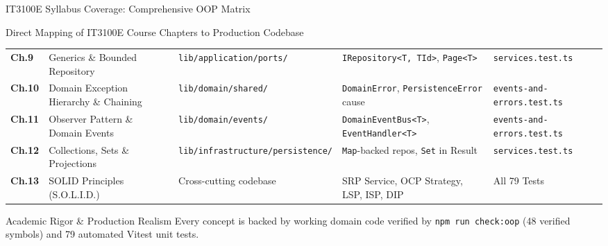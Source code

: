 ﻿\documentclass[aspectratio=169,10pt,t]{beamer}
\begin{document}
\begin{frame}{IT3100E Syllabus Coverage: Comprehensive OOP Matrix}
\begin{infoCard}{Direct Mapping of IT3100E Course Chapters to Production Codebase}
\begin{tabular}{@{}p{10mm}p{34mm}p{28mm}p{34mm}p{23mm}@{}}
      \textbf{Ch.9} & Generics \& Bounded Repository & \texttt{lib/application/ports/} & \texttt{IRepository<T, TId>}, \texttt{Page<T>} & \texttt{services.test.ts} \\
      \textbf{Ch.10} & Domain Exception Hierarchy \& Chaining & \texttt{lib/domain/shared/} & \texttt{DomainError}, \texttt{PersistenceError} cause & \texttt{events-and-errors.test.ts} \\
      \textbf{Ch.11} & Observer Pattern \& Domain Events & \texttt{lib/domain/events/} & \texttt{DomainEventBus<T>}, \texttt{EventHandler<T>} & \texttt{events-and-errors.test.ts} \\
      \textbf{Ch.12} & Collections, Sets \& Projections & \texttt{lib/infrastructure/persistence/} & \texttt{Map}-backed repos, \texttt{Set} in Result & \texttt{services.test.ts} \\
      \textbf{Ch.13} & SOLID Principles (S.O.L.I.D.) & Cross-cutting codebase & SRP Service, OCP Strategy, LSP, ISP, DIP & All 79 Tests \\
      \bottomrule
    \end{tabular}
  \end{infoCard}
  \vspace{0.4mm}
  \begin{hlCard}{Academic Rigor \& Production Realism}
    \fontsize{5.4pt}{6.4pt}\selectfont
    Every concept is backed by working domain code verified by \texttt{npm run check:oop} (48 verified symbols) and 79 automated Vitest unit tests.
  \end{hlCard}
\end{frame}
\end{document}
